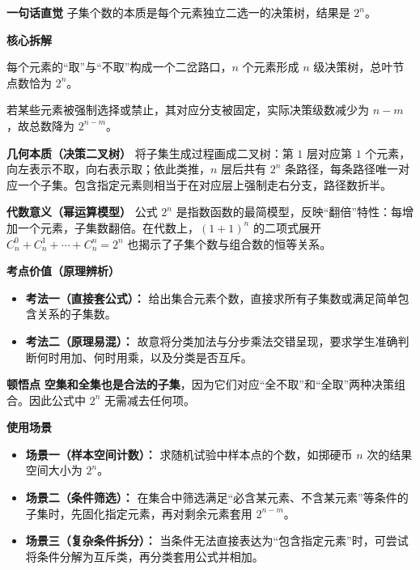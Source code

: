 \begin{explanationbox}
	\textbf{\textcolor{CExplanation}{一句话直觉}}
	子集个数的本质是每个元素独立二选一的决策树，结果是 $2^n$。

	\medskip
	\textbf{\textcolor{CExplanation}{核心拆解}}
	\begin{description}[style=nextline, leftmargin=2.8em, labelsep=0.5em, itemsep=0.45em]
		\item[\textbf{要点一（独立二选一）：}] 每个元素的“取”与“不取”构成一个二岔路口，$n$ 个元素形成 $n$ 级决策树，总叶节点数恰为 $2^n$。
		\item[\textbf{要点二（强制包含排除）：}] 若某些元素被强制选择或禁止，其对应分支被固定，实际决策级数减少为 $n-m$，故总数降为 $2^{n-m}$。
	\end{description}

	\medskip
	\textbf{\textcolor{CExplanation}{几何本质（决策二叉树）}}
	将子集生成过程画成二叉树：第 $1$ 层对应第 $1$ 个元素，向左表示不取，向右表示取；依此类推，$n$ 层后共有 $2^n$ 条路径，每条路径唯一对应一个子集。包含指定元素则相当于在对应层上强制走右分支，路径数折半。

	\medskip
	\textbf{\textcolor{CExplanation}{代数意义（幂运算模型）}}
	公式 $2^n$ 是指数函数的最简模型，反映“翻倍”特性：每增加一个元素，子集数翻倍。在代数上，$(1+1)^n$ 的二项式展开 $C_n^0 + C_n^1 + \cdots + C_n^n = 2^n$ 也揭示了子集个数与组合数的恒等关系。

	\medskip
	\textbf{\textcolor{CExplanation}{考点价值（原理辨析）}}
	\begin{itemize}[leftmargin=*, itemsep=0.5em, topsep=0.4em]
		\item \textbf{考法一（直接套公式）：} 给出集合元素个数，直接求所有子集数或满足简单包含关系的子集数。
		\item \textbf{考法二（原理易混）：} 故意将分类加法与分步乘法交错呈现，要求学生准确判断何时用加、何时用乘，以及分类是否互斥。
	\end{itemize}

	\medskip
	\textbf{\textcolor{CExplanation}{顿悟点}}
	\textbf{空集和全集也是合法的子集}，因为它们对应“全不取”和“全取”两种决策组合。因此公式中 $2^n$ 无需减去任何项。

	\medskip
	\textbf{\textcolor{CExplanation}{使用场景}}
	\begin{itemize}[leftmargin=*, itemsep=0.5em, topsep=0.4em]
		\item \textbf{场景一（样本空间计数）：} 求随机试验中样本点的个数，如掷硬币 $n$ 次的结果空间大小为 $2^n$。
		\item \textbf{场景二（条件筛选）：} 在集合中筛选满足“必含某元素、不含某元素”等条件的子集时，先固化指定元素，再对剩余元素套用 $2^{n-m}$。
		\item \textbf{场景三（复杂条件拆分）：} 当条件无法直接表达为“包含指定元素”时，可尝试将条件分解为互斥类，再分类套用公式并相加。
	\end{itemize}
\end{explanationbox}
